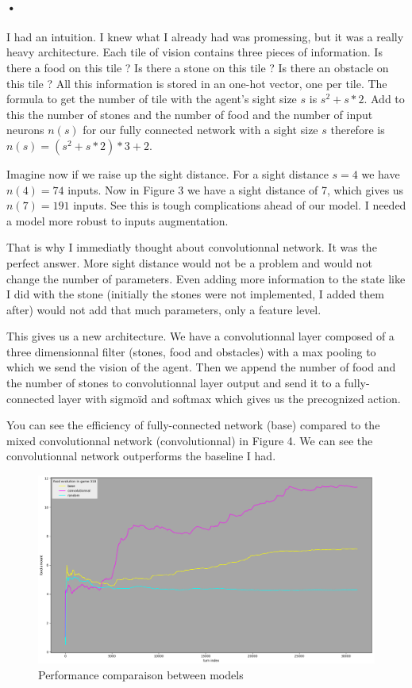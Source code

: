 \documentclass{article}
\begin{document}
\paragraph{•}
I had an intuition. I knew what I already had was promessing, but it was a really heavy architecture. Each tile of vision contains three pieces of information. Is there a food on this tile ? Is there a stone on this tile ? Is there an obstacle on this tile ? All this information is stored in an one-hot vector, one per tile. The formula to get the number of tile with the agent's sight size $s$ is $s^2 + s * 2$. Add to this the number of stones and the number of food and the number of input neurons $n(s)$ for our fully connected network with a sight size $s$ therefore is $n(s) = (s^2 + s * 2) * 3 + 2$.\par
Imagine now if we raise up the sight distance. For a sight distance $s = 4$ we have $n(4) = 74$ inputs. Now in Figure 3 we have a sight distance of 7, which gives us $n(7) = 191$ inputs. See this is tough complications ahead of our model. I needed a model more robust to inputs augmentation.\par
That is why I immediatly thought about convolutionnal network. It was the perfect answer. More sight distance would not be a problem and would not change the number of parameters. Even adding more information to the state like I did with the stone (initially the stones were not implemented, I added them after) would not add that much parameters, only a feature level.\par
This gives us a new architecture. We have a convolutionnal layer composed of a three dimensionnal filter (stones, food and obstacles) with a max pooling to which we send the vision of the agent. Then we append the number of food and the number of stones to convolutionnal layer output and send it to a fully-connected layer with sigmoïd and softmax which gives us the precognized action.\par
You can see the efficiency of fully-connected network (base) compared to the mixed convolutionnal network (convolutionnal) in Figure 4. We can see the convolutionnal network outperforms the baseline I had.

\begin{figure}
\centering
\includegraphics[scale=0.35]{figure_5.png}
\caption{Performance comparaison between models}
\end{figure}
\end{document}

